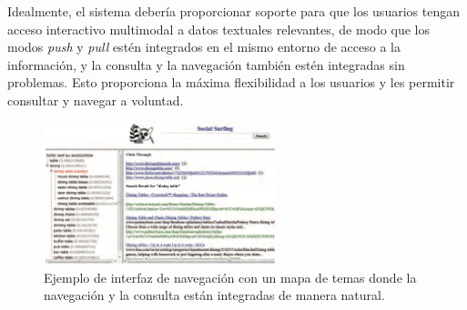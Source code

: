 Idealmente, el sistema debería proporcionar soporte para que los usuarios tengan acceso interactivo multimodal a datos textuales relevantes, de modo que los modos \textit{push} y \textit{pull} estén integrados en el mismo entorno de acceso a la información, y la consulta y la navegación también estén integradas sin problemas. Esto proporciona la máxima flexibilidad a los usuarios y les permitir consultar y navegar a voluntad. \\

\begin{figure}[h]
\centering
\includegraphics[width=0.6\textwidth]{fotos/13.png}
\caption{Ejemplo de interfaz de navegación con un mapa de temas donde la navegación y la consulta están integradas de manera natural.}
\label{fig:5.2}
\end{figure}

